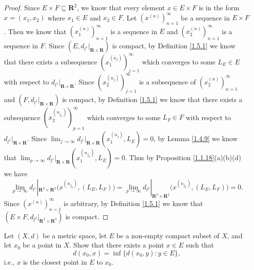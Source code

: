 \begin{proof}
    Since \(E \times F \subseteq \mathbf{R}^2\), we know that every element \(x \in E \times F\) is in the form \(x = (x_1, x_2)\) where \(x_1 \in E\) and \(x_2 \in F\).
    Let \((x^{(n)})_{n = 1}^\infty\) be a sequence in \(E \times F\).
    Then we know that \((x_1^{(n)})_{n = 1}^\infty\) is a sequence in \(E\) and \((x_2^{(n)})_{n = 1}^\infty\) is a sequence in \(F\).
    Since \((E, d_{l^1}|_{\mathbf{R} \times \mathbf{R}})\) is compact, by Definition \ref{1.5.1} we know that there exists a subsequence \((x_1^{(n_j)})_{j = 1}^\infty\) which converges to some \(L_E \in E\) with respect to \(d_{l^1}|_{\mathbf{R} \times \mathbf{R}}\).
    Since \((x_2^{(n_j)})_{j = 1}^\infty\) is a subsequence of \((x_2^{(n)})_{n = 1}^\infty\) and \((F, d_{l^1}|_{\mathbf{R} \times \mathbf{R}})\) is compact, by Definition \ref{1.5.1} we know that there exists a subsequence \((x_2^{(n_{j_p})})_{p = 1}^\infty\) which converges to some \(L_F \in F\) with respect to \(d_{l^1}|_{\mathbf{R} \times \mathbf{R}}\).
    Since \(\lim_{j \to \infty} d_{l^1}|_{\mathbf{R} \times \mathbf{R}}(x_1^{(n_j)}, L_E) = 0\), by Lemma \ref{1.4.9} we know that \(\lim_{p \to \infty} d_{l^1}|_{\mathbf{R} \times \mathbf{R}}(x_1^{(n_{j_p})}, L_E) = 0\).
    Thus by Proposition \ref{1.1.18}(a)(b)(d) we have
    \[
        \lim_{p \to \infty} d_{l^1}|_{\mathbf{R}^2 \times \mathbf{R}^2}\big(x^{(n_{j_p})}, (L_E, L_F)\big) = \lim_{p \to \infty} d_{l^2}|_{\mathbf{R}^2 \times \mathbf{R}^2}\big(x^{(n_{j_p})}, (L_E, L_F)\big) = 0.
    \]
    Since \((x^{(n)})_{n = 1}^\infty\) is arbitrary, by Definition \ref{1.5.1} we know that \((E \times F, d_{l^2}|_{\mathbf{R}^2 \times \mathbf{R}^2})\) is compact.
\end{proof}

\begin{exercise}\label{ex 1.5.14}
    Let \((X, d)\) be a metric space, let \(E\) be a non-empty compact subset of \(X\), and let \(x_0\) be a point in \(X\).
    Show that there exists a point \(x \in E\) such that
    \[
        d(x_0, x) = \inf\{d(x_0, y) : y \in E\},
    \]
    i.e., \(x\) is the closest point in \(E\) to \(x_0\).
\end{exercise}

